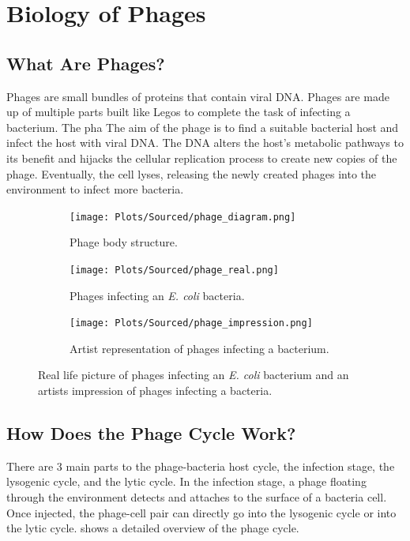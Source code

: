 \section{Biology of Phages}
\subsection{What Are Phages?}
Phages are small bundles of proteins that contain viral DNA. 
Phages are made up of multiple parts built like Legos to complete the task of infecting a bacterium. 
The pha
The aim of the phage is to find a suitable bacterial host and infect the host with viral DNA. 
The DNA alters the host's metabolic pathways to its benefit and hijacks the cellular replication process to create new copies of the phage. 
Eventually, the cell lyses, releasing the newly created phages into the environment to infect more bacteria. 
\begin{figure}[h!]
    \centering
    \begin{subfigure}{0.25\linewidth}
        \centering
        \texttt{[image: Plots/Sourced/phage\_diagram.png]}
        \caption{
            Phage body structure. 
        }
        \label{fig:plots:sourced:phage_diagram}
    \end{subfigure}
    \hfill
    \begin{subfigure}{0.3\linewidth}
        \centering
        \texttt{[image: Plots/Sourced/phage\_real.png]}
        \caption{
            Phages infecting an \textit{E. coli} bacteria. 
        }
        \label{fig:plots:sourced:phage_real}
    \end{subfigure}
    \hfill
    \begin{subfigure}{0.35\linewidth}
        \centering
        \texttt{[image: Plots/Sourced/phage\_impression.png]}
        \caption{
            Artist representation of phages infecting a bacterium. 
        }
        \label{fig:plots:sourced:phage_impression}
    \end{subfigure}
    \caption{Real life picture of phages infecting an \textit{E. coli} bacterium and an artists impression of phages infecting a bacteria. }
\end{figure}

\subsection{How Does the Phage Cycle Work?}
There are 3 main parts to the phage-bacteria host cycle, the infection stage, the lysogenic cycle, and the lytic cycle. 
In the infection stage, a phage floating through the environment detects and attaches to the surface of a bacteria cell. 
Once injected, the phage-cell pair can directly go into the lysogenic cycle or into the lytic cycle. 
 shows a detailed overview of the phage cycle. 
\newline 

